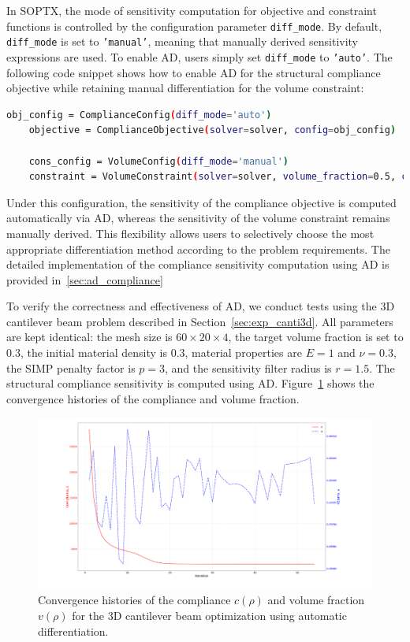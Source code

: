 \documentclass[mathpazo]{cicp}
\begin{document}
In SOPTX, the mode of sensitivity computation for objective and constraint functions is controlled by the configuration parameter \texttt{diff\_mode}. By default, \texttt{diff\_mode} is set to \texttt{'manual'}, meaning that manually derived sensitivity expressions are used. To enable AD, users simply set \texttt{diff\_mode} to \texttt{'auto'}. The following code snippet shows how to enable AD for the structural compliance objective while retaining manual differentiation for the volume constraint:
\begin{lstlisting}[language=bash]
	obj_config = ComplianceConfig(diff_mode='auto')
	objective = ComplianceObjective(solver=solver, config=obj_config)
	
	cons_config = VolumeConfig(diff_mode='manual')
	constraint = VolumeConstraint(solver=solver, volume_fraction=0.5, config=cons_config)
\end{lstlisting}

Under this configuration, the sensitivity of the compliance objective is computed automatically via AD, whereas the sensitivity of the volume constraint remains manually derived. This flexibility allows users to selectively choose the most appropriate differentiation method according to the problem requirements. The detailed implementation of the compliance sensitivity computation using AD is provided in~\ref{sec:ad_compliance}

To verify the correctness and effectiveness of AD, we conduct tests using the 3D cantilever beam problem described in Section~\ref{sec:exp_canti3d}. All parameters are kept identical: the mesh size is $60\times20\times4$, the target volume fraction is set to $0.3$,  the initial material density is $0.3$, material properties are $E=1$ and $\nu=0.3$, the SIMP penalty factor is $p=3$, and the sensitivity filter radius is $r=1.5$. The structural compliance sensitivity is computed using AD. Figure~\ref{fig:canti3d_ad_convergence} shows the convergence histories of the compliance and volume fraction.

\begin{figure}[htp] 
	\centering 
	\includegraphics[width=1.0\textwidth]{figures/cantilever_3d_convergence_auto.png} \caption{Convergence histories of the compliance $c(\rho)$ and volume fraction $v(\rho)$ for the 3D cantilever beam optimization using automatic differentiation.} \label{fig:canti3d_ad_convergence} 
\end{figure}
\end{document}

